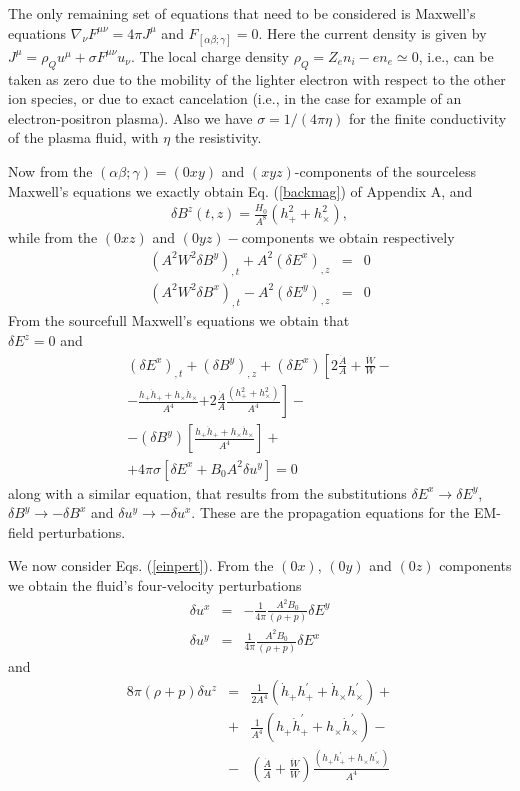 \documentclass[prd,twocolumn,showpacs,preprintnumbers,amsmath,amssy mb]{revtex4}
\newcommand{\bea}{\begin{eqnarray}}
\newcommand{\eea}{\end{eqnarray}}
\newcommand{\nn}{\nonumber}
\begin{document}
The only remaining set of equations that need to be considered 
is Maxwell's equations $\nabla _{\nu }F^{\mu \nu }=4\pi J^{\mu }$ 
and $F_{[\alpha \beta ;\gamma ]}=0$. Here the current density is 
given by\\ 
$J^{\mu }=\rho _{Q}u^{\mu }+\sigma F^{\mu \nu }u_{\nu }$. The 
local charge density $\rho _{Q}=Z_{e}n_{i}-en_{e}\simeq 0$, 
i.e., can be taken as zero due to the mobility of the lighter 
electron with respect to the other ion species, or due to  
exact cancelation (i.e., in the case for example of an 
electron-positron plasma). Also we have 
$\sigma =1/(4\pi \eta )$ for the finite conductivity 
of the plasma fluid, with $\eta $ the resistivity. 

Now from the $(\alpha \beta ;\gamma )=(0xy)$ and 
$(xyz)$-components of the sourceless Maxwell's equations 
we exactly obtain Eq. (\ref{backmag}) of Appendix A, and 
\bea 
\label{bez}
\delta B^{z}(t,z)=\frac{H_{0}}{A^{8}}(h_{+}^{2}+h_{\times }^{2}),
\eea
while from the $(0xz)$ and $(0yz)-$components we obtain 
respectively 
\bea 
\label{maxmagn}
(A^{2}W^{2}\delta B^{y})_{,t}+A^{2}(\delta E^{x})_{,z}&=&0
\nn \\
(A^{2}W^{2}\delta B^{x})_{,t}-A^{2}(\delta E^{y})_{,z}&=&0
\eea
From the sourcefull Maxwell's equations we obtain that\\ 
$\delta E^{z}=0$ and 
\bea 
\label{maxelec}
(\delta E^{x})_{,t}+(\delta B^{y})_{,z}+(\delta E^{x})
\left[2\frac{\dot{A}}{A}+\frac{\dot{W}}{W}-\right.\nn \\
-\frac{h_{+}\dot{h}_{+}+h_{\times }\dot{h}_{\times }}{A^{4}}
\left.+2\frac{\dot{A}}{A}\frac{(h_{+}^{2}+h_{\times }^{2})}{A^{4}}\right]
-\nn \\-(\delta B^{y})
\left[\frac{h_{+}\dot{h}_{+}+h_{\times }\dot{h}_{\times }}{A^{4}}\right]
+\nn \\+4\pi \sigma [\delta E^{x}+B_{0}A^{2}\delta u^{y}]=0
\eea
along with a similar equation, that results from the substitutions 
$\delta E^{x}\rightarrow \delta E^{y}$, $\delta B^{y}
\rightarrow -\delta B^{x}$ and $\delta u^{y}\rightarrow -\delta u^{x}$. 
These are the propagation equations for the EM-field perturbations. 

We now consider Eqs. (\ref{einpert}). From the $(0x)$, $(0y)$ and 
$(0z)$ components we obtain the fluid's four-velocity perturbations 
\bea 
\label{velpert}
\delta u^{x}&=&-\frac{1}{4\pi }\frac{A^{2}B_{0}}{(\rho +p)}\delta E^{y}
\nn \\
\delta u^{y}&=&\frac{1}{4\pi }\frac{A^{2}B_{0}}{(\rho +p)}\delta E^{x}
\eea
and 
\bea 
\label{uzpert}
8\pi (\rho +p)\delta u^{z}&=&\frac{1}{2A^{4}}(\dot{h}_{+}h_{+}^{'}
+\dot{h}_{\times }h_{\times }^{'})+\nn \\&+&\frac{1}{A^{4}}
(h_{+}\dot{h}_{+}^{'}+h_{\times }\dot{h}_{\times }^{'})-\nn \\
&-&\left(\frac{\dot{A}}{A}+\frac{\dot{W}}{W}\right)
\frac{(h_{+}h_{+}^{'}+h_{\times }h_{\times }^{'})}{A^{4}}
\eea
\end{document}
